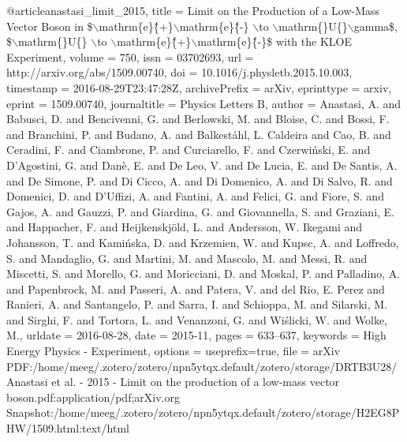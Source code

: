 @article{anastasi_limit_2015,
  title = {Limit on the Production of a Low-Mass Vector Boson in \$$\backslash$mathrm\{e\}\^\{+\}$\backslash$mathrm\{e\}\^\{-\} $\backslash$to $\backslash$mathrm\{\vphantom\}{{U}}\vphantom\{\}$\backslash$gamma\$, \$$\backslash$mathrm\{\vphantom\}{{U}}\vphantom\{\} $\backslash$to $\backslash$mathrm\{e\}\^\{+\}$\backslash$mathrm\{e\}\^\{-\}\$ with the {{KLOE}} Experiment},
  volume = {750},
  issn = {03702693},
  url = {http://arxiv.org/abs/1509.00740},
  doi = {10.1016/j.physletb.2015.10.003},
  timestamp = {2016-08-29T23:47:28Z},
  archivePrefix = {arXiv},
  eprinttype = {arxiv},
  eprint = {1509.00740},
  journaltitle = {Physics Letters B},
  author = {Anastasi, A. and Babusci, D. and Bencivenni, G. and Berlowski, M. and Bloise, C. and Bossi, F. and Branchini, P. and Budano, A. and Balkeståhl, L. Caldeira and Cao, B. and Ceradini, F. and Ciambrone, P. and Curciarello, F. and Czerwiński, E. and D'Agostini, G. and Danè, E. and De Leo, V. and De Lucia, E. and De Santis, A. and De Simone, P. and Di Cicco, A. and Di Domenico, A. and Di Salvo, R. and Domenici, D. and D'Uffizi, A. and Fantini, A. and Felici, G. and Fiore, S. and Gajos, A. and Gauzzi, P. and Giardina, G. and Giovannella, S. and Graziani, E. and Happacher, F. and Heijkenskjöld, L. and Andersson, W. Ikegami and Johansson, T. and Kamińska, D. and Krzemien, W. and Kupsc, A. and Loffredo, S. and Mandaglio, G. and Martini, M. and Mascolo, M. and Messi, R. and Miscetti, S. and Morello, G. and Moricciani, D. and Moskal, P. and Palladino, A. and Papenbrock, M. and Passeri, A. and Patera, V. and del Rio, E. Perez and Ranieri, A. and Santangelo, P. and Sarra, I. and Schioppa, M. and Silarski, M. and Sirghi, F. and Tortora, L. and Venanzoni, G. and Wiślicki, W. and Wolke, M.},
  urldate = {2016-08-28},
  date = {2015-11},
  pages = {633--637},
  keywords = {High Energy Physics - Experiment},
  options = {useprefix=true},
  file = {arXiv PDF:/home/meeg/.zotero/zotero/npn5ytqx.default/zotero/storage/DRTB3U28/Anastasi et al. - 2015 - Limit on the production of a low-mass vector boson.pdf:application/pdf;arXiv.org Snapshot:/home/meeg/.zotero/zotero/npn5ytqx.default/zotero/storage/H2EG8PHW/1509.html:text/html}
}
